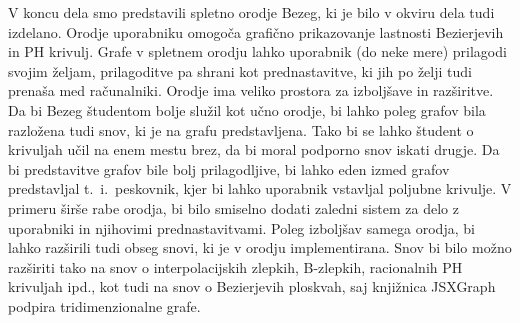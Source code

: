 \documentclass[isrm2, tisk]{fmfdelo}
\begin{document}
    V koncu dela smo predstavili spletno orodje Bezeg, ki je bilo v okviru dela tudi izdelano.
    Orodje uporabniku omogoča grafično prikazovanje lastnosti Bezierjevih in PH krivulj.
    Grafe v spletnem orodju lahko uporabnik (do neke mere) prilagodi svojim željam, prilagoditve pa shrani kot prednastavitve, ki jih po želji tudi prenaša med računalniki.
    Orodje ima veliko prostora za izboljšave in razširitve.
    Da bi Bezeg študentom bolje služil kot učno orodje, bi lahko poleg grafov bila razložena tudi snov, ki je na grafu predstavljena.
    Tako bi se lahko študent o krivuljah učil na enem mestu brez, da bi moral podporno snov iskati drugje.
    Da bi predstavitve grafov bile bolj prilagodljive, bi lahko eden izmed grafov predstavljal t.\ i.\ peskovnik, kjer bi lahko uporabnik vstavljal poljubne krivulje.
    V primeru širše rabe orodja, bi bilo smiselno dodati zaledni sistem za delo z uporabniki in njihovimi prednastavitvami.
    Poleg izboljšav samega orodja, bi lahko razširili tudi obseg snovi, ki je v orodju implementirana.
    Snov bi bilo možno razširiti tako na snov o interpolacijskih zlepkih, B-zlepkih, racionalnih PH krivuljah ipd., kot tudi na snov o Bezierjevih ploskvah, saj knjižnica JSXGraph podpira tridimenzionalne grafe.


%
%
%
%
\end{document}
